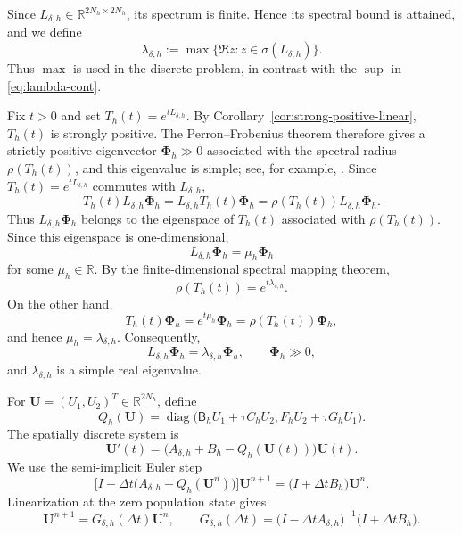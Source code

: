 \documentclass[11pt]{article}
\theoremstyle{definition}
\newcommand{\R}{\mathbb{R}}
\newcommand{\diag}{\operatorname{diag}}
\newcommand{\U}{\bm U}
\newcommand{\PhiV}{\bm\Phi}
\begin{document}
Since $L_{\delta,h}\in\R^{2N_h\times2N_h}$, its spectrum is finite.
Hence its spectral bound is attained, and we define
\begin{equation}
\label{eq:lambda-h}
 \lambda_{\delta,h}
 :=\max\{\Re z:z\in\sigma(L_{\delta,h})\}.
\end{equation}
Thus $\max$ is used in the discrete problem, in contrast with the
$\sup$ in \eqref{eq:lambda-cont}.

Fix $t>0$ and set $T_h(t)=e^{tL_{\delta,h}}$.
By Corollary~\ref{cor:strong-positive-linear}, $T_h(t)$ is strongly
positive. The Perron--Frobenius theorem therefore gives a strictly positive eigenvector $\PhiV_h\gg0$ associated with the spectral radius $\rho(T_h(t))$, and this eigenvalue is simple; see, for example, \cite{Smith1995}. Since $T_h(t)=e^{tL_{\delta,h}}$ commutes with $L_{\delta,h}$,
\[
 T_h(t)L_{\delta,h}\PhiV_h
 =
 L_{\delta,h}T_h(t)\PhiV_h
 =
 \rho(T_h(t))L_{\delta,h}\PhiV_h.
\]
Thus $L_{\delta,h}\PhiV_h$ belongs to the eigenspace of $T_h(t)$
associated with $\rho(T_h(t))$.  Since this eigenspace is
one-dimensional,
\[
 L_{\delta,h}\PhiV_h=\mu_h\PhiV_h
\]
for some $\mu_h\in\R$.  By the finite-dimensional spectral mapping
theorem,
\[
 \rho(T_h(t))
 =
 e^{t\lambda_{\delta,h}}.
\]
On the other hand,
\[
 T_h(t)\PhiV_h
 =
 e^{t\mu_h}\PhiV_h
 =
 \rho(T_h(t))\PhiV_h,
\]
and hence $\mu_h=\lambda_{\delta,h}$.  Consequently,
\begin{equation}
\label{eq:discrete-principal-pair}
 L_{\delta,h}\PhiV_h
 =\lambda_{\delta,h}\PhiV_h,
 \qquad
 \PhiV_h\gg0,
\end{equation}
and $\lambda_{\delta,h}$ is a simple real eigenvalue.

For $\U=(U_1,U_2)^T\in\R_+^{2N_h}$, define
\begin{equation}
\label{eq:Q}
 Q_h(\U)
 =
 \diag\big(\mathsf B_hU_1+\tau C_hU_2,
            F_hU_2+\tau G_hU_1\big).
\end{equation}
The spatially discrete system is
\begin{equation}
\label{eq:semidiscrete}
 \U'(t)
 =
 \big(A_{\delta,h}+B_h-Q_h(\U(t))\big)\U(t).
\end{equation}
We use the semi-implicit Euler step
\begin{equation}
\label{eq:scheme}
 \big[I-\Delta t\big(A_{\delta,h}-Q_h(\U^n)\big)\big]\U^{n+1}
 =
 \big(I+\Delta t B_h\big)\U^n.
\end{equation}
Linearization at the zero population state gives
\begin{equation}
\label{eq:linearized-step}
 \U^{n+1}
 =
 G_{\delta,h}(\Delta t)\U^n,
 \qquad
 G_{\delta,h}(\Delta t)
 =
 \big(I-\Delta t A_{\delta,h}\big)^{-1}
 \big(I+\Delta t B_h\big).
\end{equation}
\end{document}
